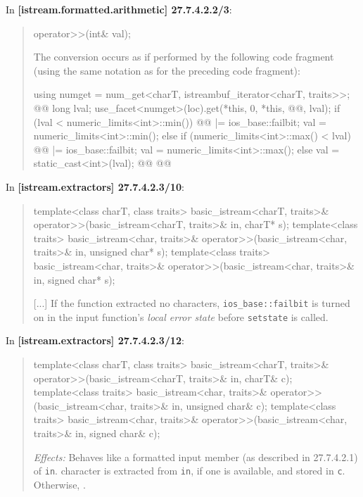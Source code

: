 \documentclass{wg21}
\begin{document}
In \textbf{[istream.formatted.arithmetic] 27.7.4.2.2/3}:
\begin{quote}
\begin{codeblock}
operator>>(int& val);
\end{codeblock}
The conversion occurs as if performed by the following code fragment (using the
same notation as for the preceding code fragment):
\begin{codeblock}
  using numget = num_get<charT, istreambuf_iterator<charT, traits>>;
  @@
  long lval;
  use_facet<numget>(loc).get(*this, 0, *this, @@, lval);
  if (lval < numeric_limits<int>::min()) {
    @@ |= ios_base::failbit;
    val = numeric_limits<int>::min();
  } else if (numeric_limits<int>::max() < lval) {
    @@ |= ios_base::failbit;
    val = numeric_limits<int>::max();
  }  else
    val = static_cast<int>(lval);
  @\added{\}}@
  @@
\end{codeblock}
\end{quote}

In \textbf{[istream.extractors] 27.7.4.2.3/10}:
\begin{quote}
\begin{codeblock}
template<class charT, class traits>
  basic_istream<charT, traits>& operator>>(basic_istream<charT, traits>& in, charT* s);
template<class traits>
  basic_istream<char, traits>& operator>>(basic_istream<char, traits>& in, unsigned char* s);
template<class traits>
  basic_istream<char, traits>& operator>>(basic_istream<char, traits>& in, signed char* s);
\end{codeblock}
[...]
If the function extracted no characters, 
{\texttt{ios_base::failbit} is turned on in the input function's \textit{local error state}
before \texttt{setstate} is called}.
\end{quote}

In \textbf{[istream.extractors] 27.7.4.2.3/12}:
\begin{quote}
\begin{codeblock}
template<class charT, class traits>
  basic_istream<charT, traits>& operator>>(basic_istream<charT, traits>& in, charT& c);
template<class traits>
  basic_istream<char, traits>& operator>>(basic_istream<char, traits>& in, unsigned char& c);
template<class traits>
  basic_istream<char, traits>& operator>>(basic_istream<char, traits>& in, signed char& c);
\end{codeblock}
\textit{Effects:} Behaves like a formatted input member (as described in 27.7.4.2.1)
of \texttt{in}.  character
is extracted from \texttt{in}, if one is available, and stored in \texttt{c}.
Otherwise, .
\end{quote}
\end{document}
